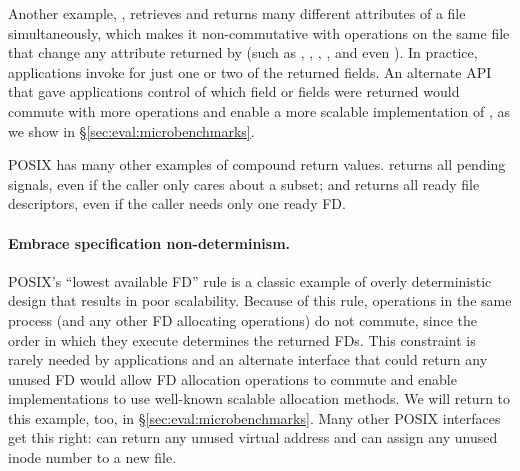 Another example, , retrieves and returns many
different attributes of a file simultaneously, which makes it
non-commutative with operations on the same file that change any
attribute returned by  (such as , ,
, , and even ).  In practice,
applications invoke  for just one or two of the returned
fields. An alternate API that gave applications
control of which field or fields were returned
would commute with more operations and enable a more scalable
implementation of , as we show in
\S\ref{sec:eval:microbenchmarks}.

POSIX has many other examples of compound return values.
 returns all pending signals, even if the caller only
cares about a subset;
and  returns all ready file
descriptors, even if the caller needs only one ready FD.



\paragraph{Embrace specification non-determinism.}

POSIX's ``lowest available FD'' rule is a classic example of
overly deterministic design that results in poor scalability.
Because of this rule,  operations in the same process (and
any other FD allocating operations) do not commute, since the order in
which they execute determines the returned FDs.  This constraint is rarely
needed by applications and an alternate interface
that could return any
unused FD would allow FD allocation operations to commute and enable
implementations to use well-known scalable allocation methods.  We will
return to this example, too, in \S\ref{sec:eval:microbenchmarks}.
Many other POSIX interfaces get this right:  can
return any unused virtual address and  can assign any unused
inode number to a new file.


